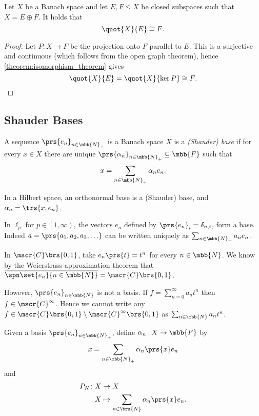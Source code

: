 \documentclass[10pt, twoside]{book}
\begin{document}
\begin{corollary}
Let $X$ be a Banach space and let $E,F \leq X$ be closed subspaces such that $X = E \oplus F$. It holds that
\[\quot{X}{E} \cong F \text{.}\]
\end{corollary}

\begin{proof}
Let $P \colon X \to F$ be the projection onto $F$ parallel to $E$. This is a surjective and continuous (which follows from the open graph theorem), hence \ref{theorem:isomorphism_theorem} gives
\[\quot{X}{E} = \quot{X}{\ker P} \cong F \text{.}\]
\end{proof}

\subsection{Shauder Bases}

\begin{definition}
A sequence $\prs{e_n}_{n \in \mbb{N}_+}$ is a Banach space $X$ is a \emph{(Shauder) base} if for every $x \in X$ there are unique $\prs{\alpha_n}_{n \in \mbb{N}_+} \subseteq \mbb{F}$ such that
\[x = \sum_{n \in \mbb{N}_+} \alpha_n e_n \text{.}\]
\end{definition}

\begin{example}
In a Hilbert space, an orthonormal base is a (Shauder) base, and $\alpha_n = \trs{x, e_n}$.
\end{example}

\begin{example}
In $\ell_p$ for $p \in \left[ 1, \infty \right)$, the vectors $e_n$ defined by $\prs{e_n}_i = \delta_{n,i}$, form a base.
Indeed
$a = \prs{a_1, a_2, a_3, \ldots}$
can be written uniquely as $\sum_{n \in \mbb{N}_+} a_n e_n$.
\end{example}

\begin{example}
In $\mscr{C}\brs{0,1}$, take $e_n\prs{t} = t^n$ for every $n \in \mbb{N}$. We know by the Weierstrass approximation theorem that $\overline{\spn\set{e_n}{n \in \mbb{N}}} = \mscr{C}\brs{0,1}$.

However, $\prs{e_n}_{n \in \mbb{N}}$ is not a basis. If $f = \sum_{n = 0}^{\infty} a_n t^n$ then $f \in \mscr{C}^\infty$. Hence we cannot write any $f \in \mscr{C}\brs{0,1} \setminus \mscr{C}^\infty\brs{0,1}$ as $\sum_{n \in \mbb{N}} a_n t^n$.
\end{example}

\begin{definition}
Given a basis $\prs{e_n}_{n \in \mbb{N}_+}$, define $\alpha_n \colon X \to \mbb{F}$ by
\[x = \sum_{n \in \mbb{N}_+} \alpha_n\prs{x} e_n\]
and
\begin{align*}
P_N \colon X &\to X \\
X &\mapsto \sum_{n \in \brs{N}} \alpha_n\prs{x} e_n \text{.}
\end{align*}
\end{definition}
\end{document}
